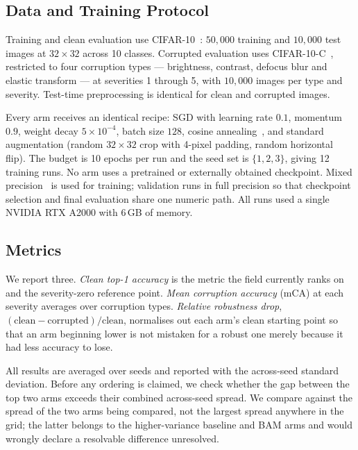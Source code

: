 \documentclass[10pt]{article}
\begin{document}
\subsection{Data and Training Protocol}

Training and clean evaluation use CIFAR-10~\citep{krizhevsky2009learning}:
$50{,}000$ training and $10{,}000$ test images at $32\times32$ across 10
classes. Corrupted evaluation uses CIFAR-10-C~\citep{hendrycks2019benchmarking},
restricted to four corruption types --- brightness, contrast, defocus blur and
elastic transform --- at severities 1 through 5, with $10{,}000$ images per type
and severity. Test-time preprocessing is identical for clean and corrupted
images.

Every arm receives an identical recipe: SGD with learning rate $0.1$, momentum
$0.9$, weight decay $5\times10^{-4}$, batch size $128$, cosine
annealing~\citep{loshchilov2017sgdr}, and standard augmentation (random
$32\times32$ crop with 4-pixel padding, random horizontal flip). The budget is
10 epochs per run and the seed set is $\{1,2,3\}$, giving 12 training runs. No
arm uses a pretrained or externally obtained checkpoint. Mixed
precision~\citep{micikevicius2018mixed} is used for training; validation runs in
full precision so that checkpoint selection and final evaluation share one
numeric path. All runs used a single NVIDIA RTX A2000 with 6\,GB of memory.

\subsection{Metrics}

We report three. \emph{Clean top-1 accuracy} is the metric the field currently
ranks on and the severity-zero reference point. \emph{Mean corruption accuracy}
(mCA) at each severity averages over corruption types. \emph{Relative robustness
drop}, $(\text{clean} - \text{corrupted})/\text{clean}$, normalises out each
arm's clean starting point so that an arm beginning lower is not mistaken for a
robust one merely because it had less accuracy to lose.

All results are averaged over seeds and reported with the across-seed standard
deviation. Before any ordering is claimed, we check whether the gap between the
top two arms exceeds their combined across-seed spread. We compare against the
spread of the two arms being compared, not the largest spread anywhere in the
grid; the latter belongs to the higher-variance baseline and BAM arms and would
wrongly declare a resolvable difference unresolved.
\end{document}
